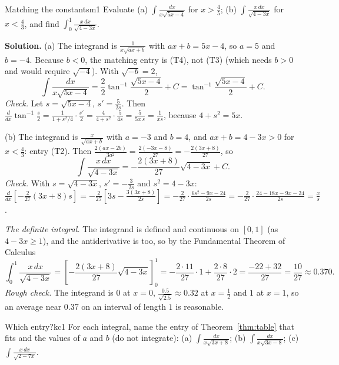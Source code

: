 \documentclass[11pt]{article}
\begin{document}
\begin{exmp}{Matching the constants}{m1}
Evaluate (a) $\displaystyle\int\frac{dx}{x\sqrt{5x-4}}$ for $x>\frac45$; (b) $\displaystyle\int\frac{x\,dx}{\sqrt{4-3x}}$ for $x<\frac43$, and find $\displaystyle\int_0^1\frac{x\,dx}{\sqrt{4-3x}}$.

\textbf{Solution.} (a) The integrand is $\frac1{x\sqrt{ax+b}}$ with $ax+b=5x-4$, so $a=5$ and $b=-4$. Because $b<0$, the matching entry is (T4), not (T3) (which needs $b>0$ and would require $\sqrt{-4}$). With $\sqrt{-b}=2$,
\[\int\frac{dx}{x\sqrt{5x-4}}=\frac2{2}\tan^{-1}\frac{\sqrt{5x-4}}2+C=\tan^{-1}\frac{\sqrt{5x-4}}2+C .\]
\emph{Check.} Let $s=\sqrt{5x-4}$, $s'=\frac5{2s}$. Then $\frac d{dx}\tan^{-1}\frac s2=\frac1{1+s^2/4}\cdot\frac{s'}2=\frac4{4+s^2}\cdot\frac5{4s}=\frac5{5x\,s}=\frac1{xs}$, because $4+s^2=5x$.

(b) The integrand is $\frac x{\sqrt{ax+b}}$ with $a=-3$ and $b=4$, and $ax+b=4-3x>0$ for $x<\frac43$: entry (T2). Then $\frac{2(ax-2b)}{3a^2}=\frac{2(-3x-8)}{27}=-\frac{2(3x+8)}{27}$, so
\[\int\frac{x\,dx}{\sqrt{4-3x}}=-\frac{2(3x+8)}{27}\sqrt{4-3x}+C .\]
\emph{Check.} With $s=\sqrt{4-3x}$, $s'=-\frac3{2s}$ and $s^2=4-3x$: $\frac d{dx}\left[-\frac2{27}(3x+8)s\right]=-\frac2{27}\left[3s-\frac{3(3x+8)}{2s}\right]=-\frac2{27}\cdot\frac{6s^2-9x-24}{2s}=-\frac2{27}\cdot\frac{24-18x-9x-24}{2s}=\frac{x}{s}$.

\emph{The definite integral.} The integrand is defined and continuous on $[0,1]$ (as $4-3x\ge1$), and the antiderivative is too, so by the Fundamental Theorem of Calculus
\[\int_0^1\frac{x\,dx}{\sqrt{4-3x}}=\left[-\frac{2(3x+8)}{27}\sqrt{4-3x}\right]_0^1=-\frac{2\cdot11}{27}\cdot1+\frac{2\cdot8}{27}\cdot2=\frac{-22+32}{27}=\frac{10}{27}\approx0.370 .\]
\emph{Rough check.} The integrand is $0$ at $x=0$, $\frac{0.5}{\sqrt{2.5}}\approx0.32$ at $x=\frac12$ and $1$ at $x=1$, so an average near $0.37$ on an interval of length $1$ is reasonable.
\end{exmp}

\begin{kc}{Which entry?}{kc1}
For each integral, name the entry of Theorem~\ref{thm:table} that fits and the values of $a$ and $b$ (do not integrate): (a) $\displaystyle\int\frac{dx}{x\sqrt{3x+8}}$; (b) $\displaystyle\int\frac{dx}{x\sqrt{3x-8}}$; (c) $\displaystyle\int\frac{x\,dx}{\sqrt{2-7x}}$.
\end{kc}
\end{document}

